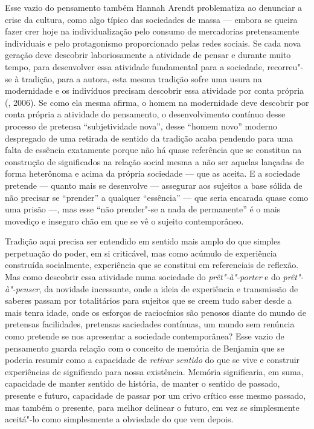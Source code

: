 Esse vazio do pensamento também Hannah Arendt problematiza ao denunciar
a crise da cultura, como algo típico das sociedades de massa --- embora
se queira fazer crer hoje na individualização pelo consumo de
mercadorias pretensamente individuais e pelo protagonismo proporcionado
pelas redes sociais. Se cada nova geração deve descobrir laboriosamente
a atividade de pensar e durante muito tempo, para desenvolver essa
atividade fundamental para a sociedade, recorreu"-se à tradição, para a
autora, esta mesma tradição sofre uma usura na modernidade e os
indivíduos precisam descobrir essa atividade por conta própria (,
2006). Se como ela mesma afirma, o homem na modernidade deve descobrir
por conta própria a atividade do pensamento, o desenvolvimento contínuo
desse processo de pretensa ``subjetividade nova'', desse ``homem novo''
moderno despregado de uma retirada de sentido da tradição acaba pendendo
para uma falta de essência exatamente porque não há quase referência que
se constitua na construção de significados na relação social mesma a não
ser aquelas lançadas de forma heterônoma e acima da própria sociedade ---
que as aceita. E a sociedade pretende --- quanto mais se desenvolve ---
assegurar aos sujeitos a base sólida de não precisar se ``prender'' a
qualquer ``essência'' --- que seria encarada quase como uma prisão ---,
mas esse ``não prender"-se a nada de permanente'' é o mais movediço e
inseguro chão em que se vê o sujeito contemporâneo.

Tradição aqui precisa ser entendido em sentido mais amplo do que simples
perpetuação do poder, em si criticável, mas como acúmulo de experiência
construída socialmente, experiência que se constitui em referenciais de
reflexão. Mas como descobrir essa atividade numa sociedade do
\emph{prêt"-à"-porter} e do \emph{prêt"-à"-penser}, da novidade incessante,
onde a ideia de experiência e transmissão de saberes passam por
totalitários para sujeitos que se creem tudo saber desde a mais tenra
idade, onde os esforços de raciocínios são penosos diante do mundo de
pretensas facilidades, pretensas saciedades contínuas, um mundo sem
renúncia como pretende se nos apresentar a sociedade contemporânea? Esse
vazio de pensamento guarda relação com o conceito de memória de Benjamin
que se poderia resumir como a capacidade de \emph{retirar
sentido} do que se vive e construir experiências de significado para
nossa existência. Memória significaria, em suma, capacidade de manter
sentido de história, de manter o sentido de passado, presente e futuro,
capacidade de passar por um crivo crítico esse mesmo passado, mas também
o presente, para melhor delinear o futuro, em vez se simplesmente
aceitá"-lo como simplesmente a obviedade do que vem depois.

